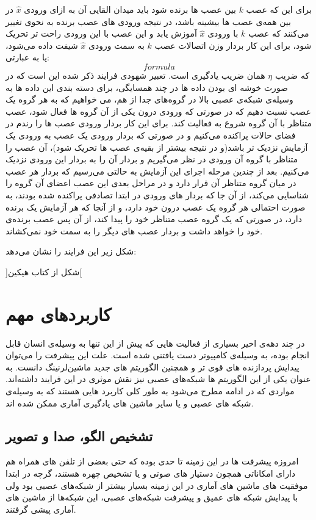 \documentclass[11pt,a4paper,twocolumn]{article}
\begin{document}
برای این که عصب $k$ بین عصب ها برنده شود باید میدان القایی آن به ازای ورودی $\widehat x$ در بین همه‌ی عصب ها بیشینه باشد، در نتیجه ورودی های عصب برنده به نحوی تغییر می‌کنند که عصب  $k$ با ورودی $\widehat x$ آموزش یابد و این عصب با این ورودی راحت تر تحریک شود، برای این کار بردار وزن اتصالات عصب $k$ به سمت ورودی $\widehat x$ شیفت داده می‌شود، یا به عبارتی:
$$formula$$
که ضریب $\eta$ همان ضریب یادگیری است. تعبیر شهودی فرایند ذکر شده این است که در صورت خوشه ای بودن داده ها در چند همسایگی، برای دسته بندی این داده ها به وسیله‌ی شبکه‌ی عصبی بالا در گروه‌های جدا از هم، می خواهیم که به هر گروه یک عصب نسبت دهیم که در صورتی که ورودی درون یکی از آن گروه ها فعال شود، عصب متناظر با آن گروه شروع به فعالیت کند. برای این کار بردار ورودی عصب ها را رندم در فضای حالات پراکنده می‌کنیم و در صورتی که بردار ورودی یک عصب به ورودی یک آزمایش نزدیک تر باشد(و در نتیجه بیشتر از بقیه‌ی عصب ها تحریک شود)، آن عصب را متناظر با گروه آن ورودی در نظر می‌گیریم و بردار آن را به بردار این ورودی نزدیک می‌کنیم. بعد از چندین مرحله اجرای این آزمایش به حالتی می‌رسیم که بردار هر عصب در میان گروه متناظر آن قرار دارد و در مراحل بعدی این عصب اعضای آن گروه را شناسایی می‌کند، از آن جا که بردار های ورودی در ابتدا تصادفی پراکنده شده بودند، به صورت احتمالی هر گروه یک عصب درون خود دارد، و از آنجا که هر آزمایش یک برنده دارد، در صورتی که یک گروه عصب متناظر خود را پیدا کند، از آن پس عصب برنده‌ی خود را خواهد داشت و بردار عصب های دیگر را به سمت خود نمی‌کشاند.

شکل زیر این فرایند را نشان می‌دهد:

]شکل از کتاب هیکین[
\section{کاربرد‌های مهم}
در چند دهه‌ی اخیر بسیاری از فعالیت هایی که پیش از این تنها به وسیله‌ی انسان قابل انجام بوده، به وسیله‌ی کامپیوتر دست یافتنی شده است. علت این پیشرفت را می‌توان پیدایش پردازنده های قوی تر و همچنین الگوریتم های جدید ماشین‌لرنینگ  دانست.
به عنوان یکی از این الگوریتم ها شبکه‌های عصبی نیز نقش موثری در این فرایند داشته‌اند. مواردی که در ادامه مطرح می‌شود به طور کلی کاربرد هایی هستند که به وسیله‌ی شبکه های عصبی و یا سایر ماشین های یادگیری آماری ممکن شده اند.
\subsection{تشخیص الگو، صدا و تصویر}
امروزه پیشرفت ها در این زمینه تا حدی بوده که حتی بعضی از تلفن های همراه هم دارای امکاناتی همچون دستیار های صوتی و یا تشخیص چهره هستند، گرچه در ابتدا موفقیت های ماشین های آماری در این زمینه بسیار بیشتر از شبکه‌های عصبی بود ولی با پیدایش شبکه های عمیق و پیشرفت شبکه‌های عصبی، این شبکه‌ها از ماشین های آماری پیشی گرفتند.
\end{document}
